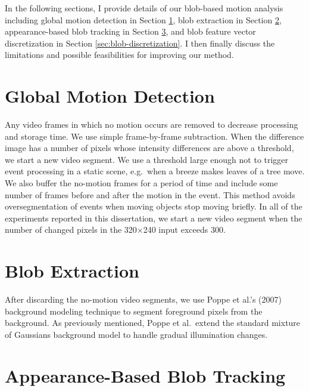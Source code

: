 In the following sections, I provide details of our blob-based motion
analysis including global motion detection in
Section \ref{sec:blob-motion-detection}, blob extraction in
Section \ref{sec:blob-blob-extraction}, appearance-based blob tracking
in Section \ref{sec:blob-appearance-based-blob-tracking}, and blob
feature vector discretization in
Section \ref{sec:blob-discretization}. I then finally discuss the
limitations and possible feasibilities for improving our method.

\section{Global Motion Detection}
\label{sec:blob-motion-detection}

Any video frames in which no motion occurs are removed to decrease
processing and storage time. We use simple frame-by-frame
subtraction. When the difference image has a number of pixels whose
intensity differences are above a threshold, we start a new video
segment. We use a threshold large enough not to trigger event
processing in a static scene, e.g.\ when a breeze makes leaves of a
tree move. We also buffer the no-motion frames for a period of time
and include some number of frames before and after the motion in the
event. This method avoids oversegmentation of events when moving
objects stop moving briefly.  In all of the experiments reported in
this dissertation, we start a new video segment when the number of
changed pixels in the 320$\times$240 input exceeds 300.

\section{Blob Extraction}
\label{sec:blob-blob-extraction}

After discarding the no-motion video segments, we use Poppe et al.'s
(2007) background modeling technique\nocite{poppe07background} to
segment foreground pixels from the background. As previously
mentioned, Poppe et al.\ extend the standard mixture of Gaussians
background model
 to handle gradual illumination changes.

\section{Appearance-Based Blob Tracking}
\label{sec:blob-appearance-based-blob-tracking}

